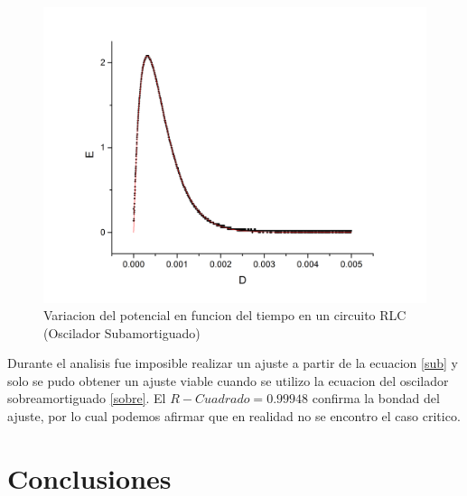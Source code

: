 \documentclass[11pt,a4paper]{article}
\begin{document}
\begin{figure}[H]
\centering
\includegraphics[scale=0.45]{RLC-Amortiguado_Critico(MasPiola)}
  \caption{Variacion del potencial en funcion del tiempo en un circuito RLC (Oscilador Subamortiguado)}
  \label{fig:RLC-sA}
\end{figure}

Durante el analisis fue imposible realizar un ajuste a partir de la ecuacion \eqref{sub} y solo se pudo obtener un ajuste viable cuando se utilizo la ecuacion del oscilador sobreamortiguado \eqref{sobre}. El $R-Cuadrado = 0.99948$ confirma la bondad del ajuste, por lo cual podemos afirmar que en realidad no se encontro el caso critico.




\section{Conclusiones}
\label{sec:conclusiones}




\end{document}
